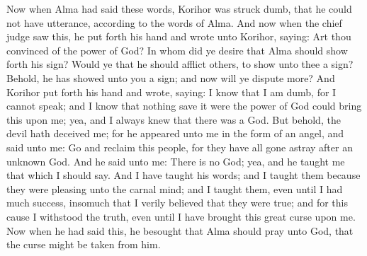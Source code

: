 Now when Alma had said these words, Korihor was struck dumb, that he could not have utterance, according to the words of Alma.
\bverse \iffalse And now when the chief judge saw this, he put forth his hand and wrote unto Korihor, saying: Art thou convinced of the power of God? In whom did ye desire that Alma should show forth his sign? Would ye that he should afflict others, to show unto thee a sign? Behold, he has showed unto you a sign; and now will ye dispute more? \fi
And now when the chief judge saw this, he put forth his hand and wrote unto Korihor, saying: Art thou convinced of the power of God? In whom did ye desire that Alma should show forth his sign? Would ye that he should afflict others, to show unto thee a sign? Behold, he has showed unto you a sign; and now will ye dispute more?
\bverse \iffalse And Korihor put forth his hand and wrote, saying: I know that I am dumb, for I cannot speak; and I know that nothing save it were the power of God could bring this upon me; yea, and I always knew that there was a God. \fi
And Korihor put forth his hand and wrote, saying: I know that I am dumb, for I cannot speak; and I know that nothing save it were the power of God could bring this upon me; yea, and I always knew that there was a God.
\bverse \iffalse But behold, the devil hath deceived me; for he appeared unto me in the form of an angel, and said unto me: Go and reclaim this people, for they have all gone astray after an unknown God. And he said unto me: There is no God; yea, and he taught me that which I should say. And I have taught his words; and I taught them because they were pleasing unto the carnal mind; and I taught them, even until I had much success, insomuch that I verily believed that they were true; and for this cause I withstood the truth, even until I have brought this great curse upon me. \fi
But behold, the devil hath deceived me; for he appeared unto me in the form of an angel, and said unto me: Go and reclaim this people, for they have all gone astray after an unknown God. And he said unto me: There is no God; yea, and he taught me that which I should say. And I have taught his words; and I taught them because they were pleasing unto the carnal mind; and I taught them, even until I had much success, insomuch that I verily believed that they were true; and for this cause I withstood the truth, even until I have brought this great curse upon me.
\bverse \iffalse Now when he had said this, he besought that Alma should pray unto God, that the curse might be taken from him. \fi
Now when he had said this, he besought that Alma should pray unto God, that the curse might be taken from him.
